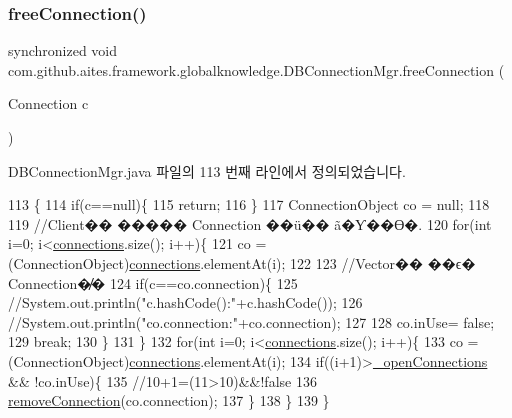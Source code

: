 \subsubsection{\texorpdfstring{free\+Connection()}{freeConnection()}\hspace{0.1cm}{\footnotesize\ttfamily [1/5]}}
{\footnotesize\ttfamily synchronized void com.\+github.\+aites.\+framework.\+globalknowledge.\+D\+B\+Connection\+Mgr.\+free\+Connection (\begin{DoxyParamCaption}\item[{Connection}]{c }\end{DoxyParamCaption})}



D\+B\+Connection\+Mgr.\+java 파일의 113 번째 라인에서 정의되었습니다.


\begin{DoxyCode}
113                                                          \{
114         \textcolor{keywordflow}{if}(c==null)\{
115             \textcolor{keywordflow}{return};
116         \}
117         ConnectionObject co = null;
118         
119         \textcolor{comment}{//Client�� ����� Connection ��ü�� ã�Ƴ��ϴ�.}
120         \textcolor{keywordflow}{for}(\textcolor{keywordtype}{int} i=0; i<\mbox{\hyperlink{classcom_1_1github_1_1aites_1_1framework_1_1globalknowledge_1_1_d_b_connection_mgr_a2a178e6371fa020ccca3e12574ef2e14}{connections}}.size(); i++)\{
121             co = (ConnectionObject)\mbox{\hyperlink{classcom_1_1github_1_1aites_1_1framework_1_1globalknowledge_1_1_d_b_connection_mgr_a2a178e6371fa020ccca3e12574ef2e14}{connections}}.elementAt(i);
122             
123             \textcolor{comment}{//Vector�� ��ϵ� Connection�̸�}
124             \textcolor{keywordflow}{if}(c==co.connection)\{
125                 \textcolor{comment}{//System.out.println("c.hashCode():"+c.hashCode());}
126                 \textcolor{comment}{//System.out.println("co.connection:"+co.connection);}
127                 
128                 co.inUse= \textcolor{keyword}{false};
129                 \textcolor{keywordflow}{break};
130             \}
131         \}
132         \textcolor{keywordflow}{for}(\textcolor{keywordtype}{int} i=0; i<\mbox{\hyperlink{classcom_1_1github_1_1aites_1_1framework_1_1globalknowledge_1_1_d_b_connection_mgr_a2a178e6371fa020ccca3e12574ef2e14}{connections}}.size(); i++)\{
133             co = (ConnectionObject)\mbox{\hyperlink{classcom_1_1github_1_1aites_1_1framework_1_1globalknowledge_1_1_d_b_connection_mgr_a2a178e6371fa020ccca3e12574ef2e14}{connections}}.elementAt(i);
134             \textcolor{keywordflow}{if}((i+1)>\mbox{\hyperlink{classcom_1_1github_1_1aites_1_1framework_1_1globalknowledge_1_1_d_b_connection_mgr_aee9709978e3b28d13c0f29382aefb70f}{\_openConnections}} && !co.inUse)\{
135                 \textcolor{comment}{//10+1=(11>10)&&!false}
136                 \mbox{\hyperlink{classcom_1_1github_1_1aites_1_1framework_1_1globalknowledge_1_1_d_b_connection_mgr_a0174f80ba00e50211d2b3faff76ee5d3}{removeConnection}}(co.connection);
137             \}
138         \}
139     \}
\end{DoxyCode}
